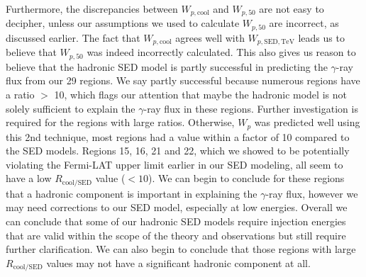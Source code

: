 \documentclass[12pt,a4paper]{article}
\begin{document}
Furthermore, the discrepancies between $W_{p,\mathrm{cool}}$ and $W_{p,50}$ are not easy to decipher, unless our assumptions we used to calculate $W_{p,50}$ are incorrect, as discussed earlier. The fact that $W_{p,\mathrm{cool}}$ agrees well with $W_{p,\mathrm{SED}, \mathrm{TeV}}$ leads us to believe that $W_{p,50}$ was indeed incorrectly calculated. This also gives us reason to believe that the hadronic SED model is partly successful in predicting the $\gamma$-ray flux from our 29 regions. We say partly successful because numerous regions have a ratio $>$ 10, which flags our attention that maybe the hadronic model is not solely sufficient to explain the $\gamma$-ray flux in these regions. Further investigation is required for the regions with large ratios. Otherwise, $W_p$ was predicted well using this 2nd technique, most regions had a value within a factor of 10 compared to the SED models. Regions 15, 16, 21 and 22, which we showed to be potentially violating the Fermi-LAT upper limit earlier in our SED modeling, all seem to have a low $R_{\mathrm{cool/SED}}$ value ($< 10$). We can begin to conclude for these regions that a hadronic component is important in explaining the $\gamma$-ray flux, however we may need corrections to our SED model, especially at low energies. Overall we can conclude that some of our hadronic SED models require injection energies that are valid within the scope of the theory and observations but still require further clarification. We can also begin to conclude that those regions with large $R_{\mathrm{cool/SED}}$ values may not have a significant hadronic component at all.
\end{document}

